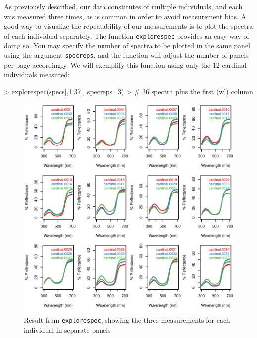 \documentclass{article}
\newcommand{\code}[1]{{\tt #1}}  %
\begin{document}
As previously described, our data constitutes of multiple individuals, and each was measured 
three times, as is common in order to avoid measurement bias. A good way to visualize the 
repeatability of our measurements is to plot the spectra of each individual separately. The 
function \code{explorespec} provides an easy way of doing so. You may specify the number of 
spectra to be plotted in the same panel using the argument \code{specreps}, and the function 
will adjust the number of panels per page accordingly. We will exemplify this function using 
only the 12 cardinal individuals measured:

\begin{Schunk}
\begin{Sinput}
> explorespec(specs[,1:37], specreps=3) 
> # 36 spectra plus the first (wl) column
\end{Sinput}
\end{Schunk}

\begin{figure} %
\begin{center}
\includegraphics[width=5in]{pavo-explorespecfig}
\end{center}
\caption{Result from \code{explorespec}, showing the three measurements for each individual in separate panels}
\label{fig1}
\end{figure}
\end{document}
